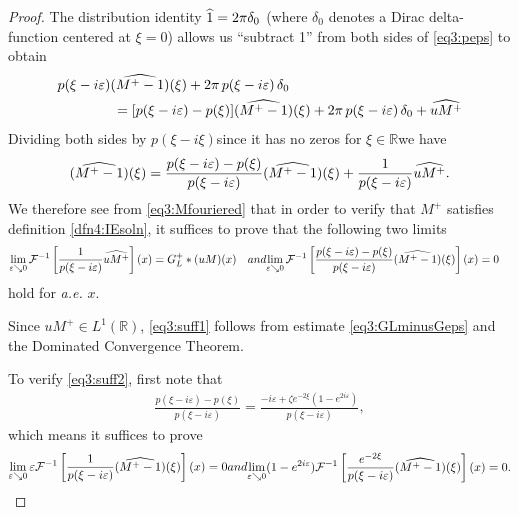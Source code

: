 \documentclass[../dissertation.tex]{subfiles}
\begin{document}
\begin{proof}
	The distribution identity $\widehat{1} = 2\pi\delta_0$ (where $\delta_0$ denotes a 
	Dirac delta-function centered at $\xi=0$) allows us ``subtract 1'' from both
	sides of \eqref{eq3:peps} to obtain
	\begin{align*}
		&p(\xi -i \varepsilon)(\widehat{M^+-1})(\xi) + 2\pi \, p(\xi-i\varepsilon)\,\delta_0 \\
		&\qquad\qquad= [p(\xi-i\varepsilon) - p(\xi)]
						(\widehat{M^+-1})(\xi) 
						+ 2\pi\,p(\xi-i\varepsilon)\,\delta_0 + \widehat{uM^+}
	\end{align*}
	Dividing both sides by $p(\xi-i\xi)$\textemdash{}since it has no zeros 
	for $\xi\in \mathbb R$\textemdash{}we have
	\begin{align}\label{eq3:Mfouriered}
		(\widehat{M^+ -1})(\xi) 
			= \frac{p(\xi-i\varepsilon) - p(\xi)}{p(\xi - i\varepsilon)}(\widehat{M^+-1})(\xi)
				+ \frac{1}{p(\xi - i\varepsilon)} \widehat{uM^+}.
	\end{align}
	We therefore see from \eqref{eq3:Mfouriered} that in order to verify that $M^+$ satisfies
	definition \ref{dfn4:IEsoln}, it suffices to prove that the following two limits
	\begin{subequations}
		\label{eq3:suff}
		\begin{align}
			\label{eq3:suff1}
			\lim_{\varepsilon \searrow 0} \mathcal F^{-1}
				 	\left[\frac{1}{p(\xi - i\varepsilon)} \wh{uM^+}\right](x)
				 &= G_L^+*(uM)(x)
		\end{align}
		and
		\begin{align}
			\label{eq3:suff2}
				\lim_{\varepsilon \searrow 0} \mathcal F^{-1}
						\left[ 
							\frac{p(\xi-i\varepsilon) - p(\xi)}{p(\xi-i\varepsilon)}
							(\wh{M^+-1})(\xi) 
						\right]
						(x)
					&= 0
		\end{align}
	\end{subequations}
	hold for \textit{a.e.} $x$.

	Since $uM^+ \in L^1(\mathbb R)$, \eqref{eq3:suff1} follows from estimate 
	\eqref{eq3:GLminusGeps} and the Dominated Convergence Theorem. 

	To verify \eqref{eq3:suff2}, first note that 
	\begin{align*}
		\frac{p(\xi - i\varepsilon) - p(\xi)}{p(\xi - i \varepsilon)}
			= \frac{-i \varepsilon + \zeta e^{-2\xi}\left(1-e^{2i\varepsilon}\right)}
					{p(\xi-i\varepsilon)},
	\end{align*}
	which means it suffices to prove 
	\begin{subequations}
		\label{eq3:secondlims}
		\begin{align} \label{eq3:secondlims1}
			\lim_{\varepsilon \searrow 0} 
				\varepsilon \mathcal F^{-1}
					\left[ 
						\frac{1}{p(\xi-i\varepsilon)} (\wh{M^+-1})(\xi) 
					\right](x) 
			= 0
		\end{align}
		and
		\begin{align} \label{eq3:secondlims2}
			\lim_{\varepsilon \searrow 0} 
				(1-e^{2i\varepsilon}) \mathcal F^{-1}
					\left[ 
						\frac{e^{-2\xi}}{p(\xi-i\varepsilon)} (\wh{M^+-1})(\xi) 
					\right](x) 
			= 0.
		\end{align}
	\end{subequations}




\end{proof}
\end{document}
